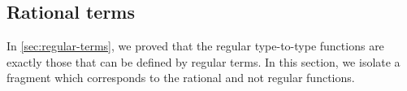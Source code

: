 \subsection{Rational terms}
\label{sec:rational-terms}
In \cref{sec:regular-terms}, we proved that the regular type-to-type functions are exactly those that can be defined by regular terms. In this section, we isolate a fragment which corresponds to the rational and not regular functions. 